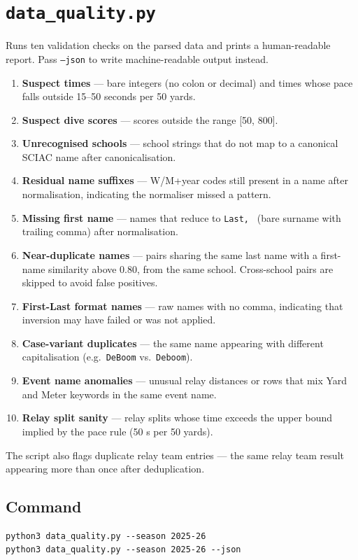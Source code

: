 \documentclass{article}
\begin{document}
\section{\texttt{data\_quality.py}}

Runs ten validation checks on the parsed data and prints a human-readable
report. Pass \texttt{--json} to write machine-readable output instead.

\begin{enumerate}[noitemsep]
  \item \textbf{Suspect times} --- bare integers (no colon or decimal) and
        times whose pace falls outside 15--50 seconds per 50 yards.
  \item \textbf{Suspect dive scores} --- scores outside the range [50, 800].
  \item \textbf{Unrecognised schools} --- school strings that do not map to a
        canonical SCIAC name after canonicalisation.
  \item \textbf{Residual name suffixes} --- W/M+year codes still present in a
        name after normalisation, indicating the normaliser missed a pattern.
  \item \textbf{Missing first name} --- names that reduce to \texttt{Last, }
        (bare surname with trailing comma) after normalisation.
  \item \textbf{Near-duplicate names} --- pairs sharing the same last name with
        a first-name similarity above 0.80, from the same school. Cross-school
        pairs are skipped to avoid false positives.
  \item \textbf{First-Last format names} --- raw names with no comma, indicating
        that inversion may have failed or was not applied.
  \item \textbf{Case-variant duplicates} --- the same name appearing with
        different capitalisation (e.g.\ \texttt{DeBoom} vs.\ \texttt{Deboom}).
  \item \textbf{Event name anomalies} --- unusual relay distances or rows that
        mix Yard and Meter keywords in the same event name.
  \item \textbf{Relay split sanity} --- relay splits whose time exceeds the
        upper bound implied by the pace rule (50 s per 50 yards).
\end{enumerate}

The script also flags duplicate relay team entries --- the same relay team
result appearing more than once after deduplication.

\subsection*{Command}
\begin{lstlisting}
python3 data_quality.py --season 2025-26
python3 data_quality.py --season 2025-26 --json
\end{lstlisting}
\end{document}
